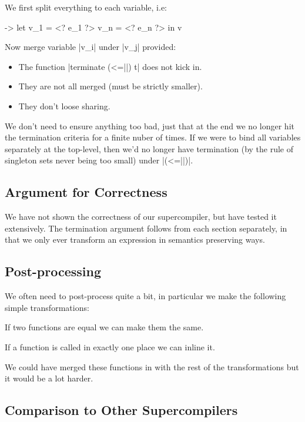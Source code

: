 \documentclass[draft]{sigplanconf}
\begin{document}
We first split everything to each variable, i.e:

\begin{code}
\free ->  let  v_1 = <? e_1 ?>
               v_n = <? e_n ?>
          in   v
\end{code}

Now merge variable |v_i| under |v_j| provided:

\begin{itemize}
\item The function |terminate (<=||) t| does not kick in.
\item They are not all merged (must be strictly smaller).
\item They don't loose sharing.
\end{itemize}


We don't need to ensure anything too bad, just that at the end we no longer hit the termination criteria for a finite nuber of times. If we were to bind all variables separately at the top-level, then we'd no longer have termination (by the rule of singleton sets never being too small) under |(<=||)|.

\subsection{Argument for Correctness}

We have not shown the correctness of our supercompiler, but have tested it extensively. The termination argument follows from each section separately, in that we only ever transform an expression in semantics preserving ways.

\subsection{Post-processing}
\label{sec:postprocess}

We often need to post-process quite a bit, in particular we make the following simple transformations:

If two functions are equal we can make them the same.

If a function is called in exactly one place we can inline it.

We could have merged these functions in with the rest of the transformations but it would be a lot harder.

\subsection{Comparison to Other Supercompilers}
\label{sec:comparison}
\end{document}
